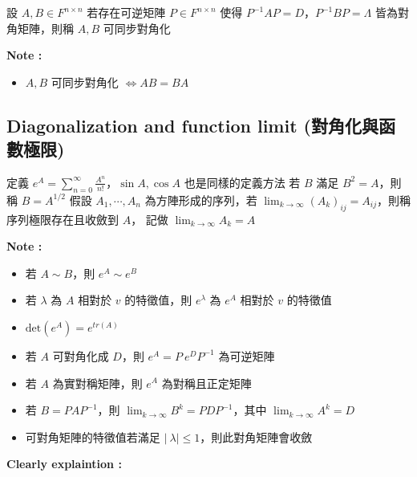 \documentclass[
]{book}
\providecommand{\tightlist}{%
  \setlength{\itemsep}{0pt}\setlength{\parskip}{0pt}}
\begin{document}
設 \(A, B \in F^{n\times n}\) 若存在可逆矩陣 \(P \in F^{n\times n}\) 使得 \(P^{-1}AP = D\)，\(P^{-1}BP = \Lambda\) 皆為對角矩陣，則稱 \(A, B\) 可同步對角化

\textbf{Note :}

\begin{itemize}
\tightlist
\item
  \(A, B\) 可同步對角化 \(\iff AB = BA\)
\end{itemize}

\hypertarget{diagonalization-and-function-limit-ux5c0dux89d2ux5316ux8207ux51fdux6578ux6975ux9650}{%
\subsection{Diagonalization and function limit (對角化與函數極限)}\label{diagonalization-and-function-limit-ux5c0dux89d2ux5316ux8207ux51fdux6578ux6975ux9650}}

定義 \(e^A = \displaystyle \sum_{n=0}^{\infty}\frac{A^n}{n!}\)，\(\sin A, \cos A\) 也是同樣的定義方法
若 \(B\) 滿足 \(B^2 = A\)，則稱 \(B = A^{1/2}\)
假設 \(A_1, \cdots, A_n\) 為方陣形成的序列，若 \(\displaystyle\lim_{k \to \infty}(A_k)_{ij} = A_{ij}\)，則稱序列極限存在且收斂到 \(A\)，
記做 \(\displaystyle \lim_{k \to \infty}A_k = A\)

\textbf{Note :}

\begin{itemize}
\tightlist
\item
  若 \(A \sim B\)，則 \(e^A \sim e^B\)
\item
  若 \(\lambda\) 為 \(A\) 相對於 \(v\) 的特徵值，則 \(e^{\lambda}\) 為 \(e^A\) 相對於 \(v\) 的特徵值
\item
  \(\mbox{det}(e^A) = e^{tr(A)}\)
\item
  若 \(A\) 可對角化成 \(D\)，則 \(e^A = P\ e^DP^{-1}\) 為可逆矩陣
\item
  若 \(A\) 為實對稱矩陣，則 \(e^A\) 為對稱且正定矩陣
\item
  若 \(B = PAP^{-1}\)，則 \(\displaystyle \lim_{k \to \infty}B^k = PDP^{-1}\)，其中 \(\displaystyle\lim_{k \to \infty}A^k = D\)
\item
  可對角矩陣的特徵值若滿足 \(\mid\ \lambda\mid \leq 1\)，則此對角矩陣會收斂
\end{itemize}

\textbf{Clearly explaintion :}
\end{document}
